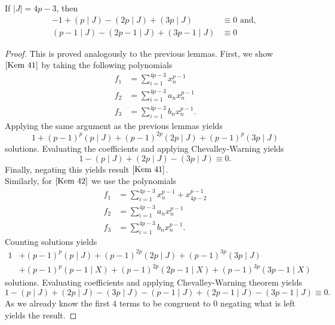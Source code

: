 \begin{lemma}\label{KemCorr4}
	If \(\left| J \right| = 4p-3\), then \begin{align}
		-1 + \left( p \mid J \right)  - \left( 2p \mid J \right)  + \left(3p \mid J \right) &\equiv 0 \text{ and, }\label{Kem 41}\\
		\left( p-1 \mid J \right) - \left( 2p-1 \mid J \right) + \left( 3p-1 \mid J \right) &\equiv 0 \label{Kem 42}
		\end{align}
\end{lemma}
\begin{proof}
	This is proved analogously to the previous lemmas. First, we show \(\refeq{Kem 41}\) by taking the following polynomials
	\begin{align*}
		f_1 &= \sum_{i= 1}^{4p-3} x_{n}^{p-1}\\
		f_2 &=  \sum_{i= 1}^{4p-3} a_{n} x_{n}^{p-1} \\
		f_3&= \sum_{i= 1}^{4p-3} b_{n} x_{n}^{p-1}
	.\end{align*}
	Applying the same argument as the previous lemmas yields \[
		1 + \left( p-1 \right) ^{p}\left( p\mid J \right) + \left( p-1 \right) ^{2p} \left( 2p \mid J \right)  + \left( p-1 \right) ^{p}\left( 3p\mid J  \right)
	\] solutions. Evaluating the coefficients and applying Chevalley-Warning yields \[
	1 - \left( p \mid J \right)  + \left( 2p \mid J \right)  - \left( 3p \mid J \right)  \equiv 0
	.\]
	Finally, negating this yields result \(\refeq{Kem 41}\).\\
	Similarly, for \(\refeq{Kem 42}\) we use the polynomials
	\begin{align*}
		f_1 &=  \sum_{i= 1}^{4p-3} x_{n}^{p-1} + x_{4p-2}^{p-1}\\
		f_2 &= \sum_{i= 1}^{4p-3} a_{n}x_{n}^{p-1} \\
		f_3&= \sum_{i= 1}^{4p-3} b_{n} x_{n}^{p-1}
	.\end{align*}
	Counting solutions yields \begin{align*}
		1 &+ \left( p-1 \right) ^{p} \left( p \mid J \right)  + \left( p-1 \right) ^{2p} \left( 2p \mid J \right)  + \left( p-1 \right) ^{3p} \left( 3p \mid J \right)  \\ &+ \left( p-1 \right) ^{p} \left( p-1 \mid X \right)  + \left( p-1 \right) ^{2p} \left( 2p-1 \mid X \right)  + \left( p-1 \right) ^{3p} \left( 3p-1 \mid X \right)
		\end{align*} solutions. Evaluating coefficients and applying Chevalley-Warning theorem yields \[
	1 - \left( p \mid J \right)  + \left( 2p \mid J \right)  - \left( 3p \mid J \right)  - \left( p-1 \mid J \right)  + \left( 2p-1 \mid J \right)   - \left( 3p-1 \mid J  \right) \equiv 0
	.\]
	As we already know the first \(4\) terms to be congruent to \(0\) negating what is left yields the result.
\end{proof}
